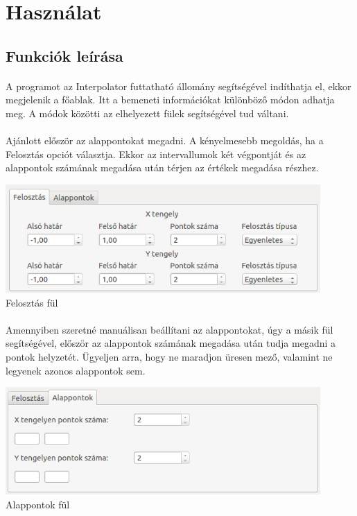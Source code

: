 \documentclass[12pt]{report}
\begin{document}
\section{Használat}

\subsection{Funkciók leírása}
\paragraph{}
A programot az Interpolator futtatható állomány segítségével indíthatja el, ekkor megjelenik a főablak.
Itt a bemeneti információkat különböző módon adhatja meg. A módok közötti az elhelyezett fülek segítségével tud váltani.
\paragraph{}
Ajánlott először az alappontokat megadni. A kényelmesebb megoldás, ha a Felosztás opciót választja. Ekkor az intervallumok két végpontját és az alappontok számának megadása után térjen az értékek megadása részhez.
\begin{center}
\includegraphics[width=12cm]{pics/gui/partition1}  \\
{\footnotesize Felosztás fül} 
\end{center}
\paragraph{}
Amennyiben szeretné manuálisan beállítani az alappontokat, úgy a másik fül segítségével, először az alappontok számának megadása után tudja megadni a pontok helyzetét. Ügyeljen arra, hogy ne maradjon üresen mező, valamint ne legyenek azonos alappontok sem.
\begin{center}
\includegraphics[width=12cm]{pics/gui/partition2}  \\
{\footnotesize Alappontok fül} 
\end{center}
\end{document}
